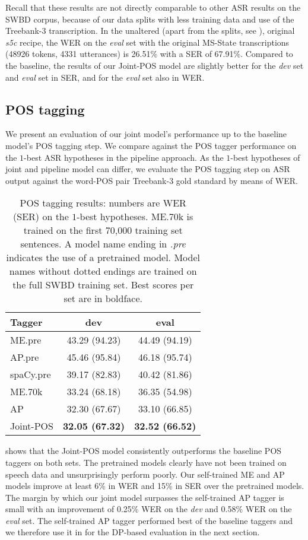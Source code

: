 \documentclass[11pt,letterpaper]{article}
\begin{document}
Recall that these results are not directly comparable to other ASR results on the SWBD corpus, because of our data splits with less training data and use of the Treebank-3 transcription. In the unaltered (apart from the splits, see ), original \emph{s5c} recipe, the WER on the \emph{eval} set with the original MS-State transcriptions (48926 tokens, 4331 utterances) is 26.51\% with a SER of 67.91\%. Compared to the baseline, the results of our Joint-POS model are slightly better for the \emph{dev} set and \emph{eval} set in SER, and for the \emph{eval} set also in WER.

\subsection{POS tagging}
We present an evaluation of our joint model's performance up to the baseline model's POS tagging step. We compare against the POS tagger performance on the $1$-best ASR hypotheses in the pipeline approach. As the $1$-best hypotheses of joint and pipeline model can differ, we evaluate the POS tagging step on ASR output against the word-POS pair Treebank-3 gold standard by means of WER.
\begin{table}[h]
    \centering
    \begin{tabular}{lcc}
    \toprule
    Tagger & dev & eval \\
    \midrule
    ME.pre & 43.29 (94.23) & 44.49 (94.19) \\
    AP.pre & 45.46 (95.84) & 46.18 (95.74) \\
    spaCy.pre & 39.17 (82.83) & 40.42 (81.86) \\
    \midrule
    ME.70k & 33.24 (68.18) & 36.35 (54.98) \\
    AP & 32.30 (67.67) & 33.10 (66.85) \\
    Joint-POS & \textbf{32.05 (67.32)} & \textbf{32.52 (66.52)} \\
    \bottomrule
    \end{tabular}
    \caption[POS tagging results: numbers are WER (SER).]{POS tagging results: numbers are WER (SER) on the $1$-best hypotheses. ME.70k is trained on the first 70,000 training set sentences. A model name ending in \emph{.pre} indicates the use of a pretrained model. Model names without dotted endings are trained on the full SWBD training set. Best scores per set are in boldface.}
    \label{tab:posres}
\end{table}

 shows that the Joint-POS model consistently outperforms the baseline POS taggers on both sets. The pretrained models clearly have not been trained on speech data and unsurprisingly perform poorly. Our self-trained ME and AP models improve at least 6\% in WER and 15\% in SER over the pretrained models. The margin by which our joint model surpasses the self-trained AP tagger is small with an improvement of 0.25\% WER on the \emph{dev} and 0.58\% WER on the \emph{eval} set. The self-trained AP tagger performed best of the baseline taggers and we therefore use it in for the DP-based evaluation in the next section.
\end{document}
